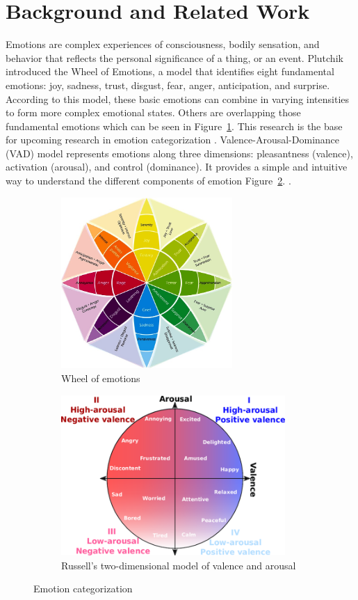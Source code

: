 \section{Background and Related Work}
\label{sec:background}

\par Emotions are complex experiences of consciousness, bodily sensation, and behavior that reflects the personal significance of a thing, or an event. Plutchik introduced the Wheel of Emotions, a model that identifies eight fundamental emotions: joy, sadness, trust, disgust, fear, anger, anticipation, and surprise. According to this model, these basic emotions can combine in varying intensities to form more complex emotional states. Others are overlapping those fundamental emotions which can be seen in Figure~\ref{fig:wheel}. This research is the base for upcoming research in emotion categorization \citep{plutchik1980general}. Valence-Arousal-Dominance (VAD) model represents emotions along three dimensions: pleasantness (valence), activation (arousal), and control (dominance). It provides a simple and intuitive way to understand the different components of emotion Figure~\ref{fig:two-dim}. \citep{oberlander2018analysis}.

\begin{figure}[h]
\centering
\begin{subfigure}[b]{0.45\textwidth}
    \includegraphics[height=2.56in,width=2.56in]{img/wheel-of-emotions.jpg}
    \caption{Wheel of emotions}
    \label{fig:wheel}
\end{subfigure}
\hfill
\begin{subfigure}[b]{0.45\textwidth}
    \includegraphics[height=2.4in,width=3.35in]{img/two-dim-modal.png}
    \caption{Russell's two-dimensional model of valence and arousal}
    \label{fig:two-dim}
\end{subfigure}
\caption{Emotion categorization}
\label{fig:combined}
\end{figure}

